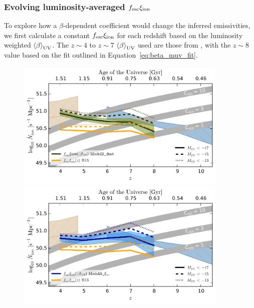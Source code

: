 \subsubsection{Evolving luminosity-averaged $f_{\rm{esc}}\xi_{\rm{ion}}$}
To explore how a $\beta$-dependent coefficient would change the inferred emissivities, we first calculate a constant $f_{\rm{esc}}\xi_{\rm{ion}}$ for each redshift based on the luminosity weighted $\left \langle \beta  \right \rangle_{\rm{UV}}$. The $z\sim4$ to $z\sim7$ $\left \langle \beta  \right \rangle_{\rm{UV}}$ used are those from \citet{Bouwens:2013vf}, with the $z\sim8$ value based on the fit outlined in Equation~\ref{eq:beta_muv_fit}. 

\begin{figure}
\centering
  \includegraphics[width=0.9\textwidth]{plots/Fig9a.pdf}
  \includegraphics[width=0.9\textwidth]{plots/Fig9b.pdf}

\end{figure}
